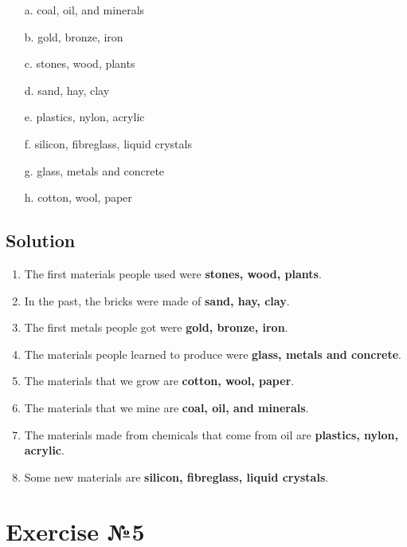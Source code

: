 \begin{enumerate}
      \item[a.] coal, oil, and minerals
      \item[b.] gold, bronze, iron
      \item[c.] stones, wood, plants
      \item[d.] sand, hay, clay
      \item[e.] plastics, nylon, acrylic
      \item[f.] silicon, fibreglass, liquid crystals
      \item[g.] glass, metals and concrete
      \item[h.] cotton, wool, paper
\end{enumerate}

\subsection*{Solution}
\begin{enumerate}
      \item The first materials people used were  \textbf{stones, wood, plants}.
      \item In the past, the bricks were made of  \textbf{sand, hay, clay}.
      \item The first metals people got were  \textbf{gold, bronze, iron}.
      \item The materials people learned to produce were  \textbf{glass, metals and concrete}.
      \item The materials that we grow are  \textbf{cotton, wool, paper}.
      \item The materials that we mine are  \textbf{coal, oil, and minerals}.
      \item The materials made from chemicals that come from oil are  \textbf{plastics, nylon, acrylic}.
      \item Some new materials are  \textbf{silicon, fibreglass, liquid crystals}.
\end{enumerate}

\section{Exercise №5}

